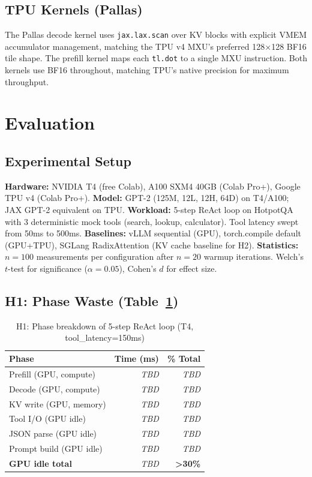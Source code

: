 \documentclass[10pt,twocolumn]{article}
\begin{document}
\subsection{TPU Kernels (Pallas)}

The Pallas decode kernel uses \texttt{jax.lax.scan} over KV blocks with
explicit VMEM accumulator management, matching the TPU v4 MXU's preferred
128×128 BF16 tile shape. The prefill kernel maps each \texttt{tl.dot} to a
single MXU instruction. Both kernels use BF16 throughout, matching TPU's
native precision for maximum throughput.

\section{Evaluation}
\label{sec:eval}

\subsection{Experimental Setup}

\textbf{Hardware:} NVIDIA T4 (free Colab), A100 SXM4 40GB (Colab Pro+),
Google TPU v4 (Colab Pro+).
\textbf{Model:} GPT-2 (125M, 12L, 12H, 64D) on T4/A100;
JAX GPT-2 equivalent on TPU.
\textbf{Workload:} 5-step ReAct loop on HotpotQA with 3 deterministic mock
tools (search, lookup, calculator). Tool latency swept from 50ms to 500ms.
\textbf{Baselines:} vLLM sequential (GPU), torch.compile default (GPU+TPU),
SGLang RadixAttention (KV cache baseline for H2).
\textbf{Statistics:} $n=100$ measurements per configuration after $n=20$
warmup iterations. Welch's $t$-test for significance ($\alpha=0.05$),
Cohen's $d$ for effect size.

\subsection{H1: Phase Waste (Table~\ref{tab:h1})}

\begin{table}[h]
\centering
\small
\caption{H1: Phase breakdown of 5-step ReAct loop (T4, tool\_latency=150ms)}
\label{tab:h1}
\begin{tabular}{lrr}
\toprule
Phase & Time (ms) & \% Total \\
\midrule
Prefill (GPU, compute) & \textit{TBD} & \textit{TBD} \\
Decode (GPU, compute)  & \textit{TBD} & \textit{TBD} \\
KV write (GPU, memory) & \textit{TBD} & \textit{TBD} \\
Tool I/O (GPU idle)    & \textit{TBD} & \textit{TBD} \\
JSON parse (GPU idle)  & \textit{TBD} & \textit{TBD} \\
Prompt build (GPU idle) & \textit{TBD} & \textit{TBD} \\
\midrule
\textbf{GPU idle total} & \textit{TBD} & \textbf{>30\%} \\
\bottomrule
\end{tabular}
\end{table}
\end{document}
